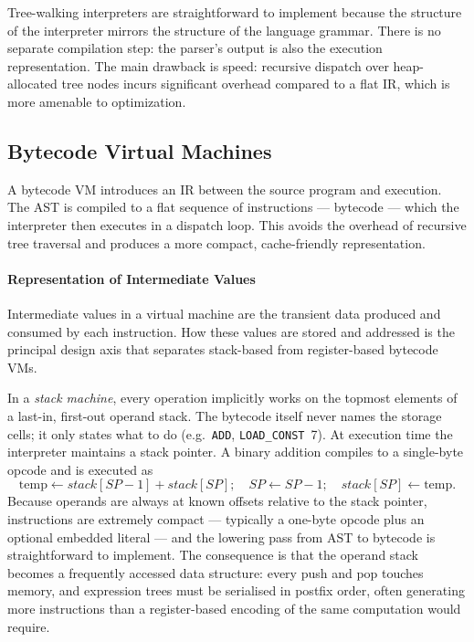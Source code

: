 Tree-walking interpreters are straightforward to implement because the structure of the interpreter mirrors the structure of the language grammar. There is no separate compilation step: the parser's output is also the execution representation. The main drawback is speed: recursive dispatch over heap-allocated tree nodes incurs significant overhead compared to a flat \ac{IR}, which is more amenable to optimization\cite{ball-interpreter-in-go}.

\subsection{Bytecode Virtual Machines}
A bytecode \ac{VM} introduces an \ac{IR} between the source program and execution. The \ac{AST} is compiled to a flat sequence of instructions — bytecode — which the interpreter then executes in a dispatch loop. This avoids the overhead of recursive tree traversal and produces a more compact, cache-friendly representation.

\paragraph{Representation of Intermediate Values}
Intermediate values in a virtual machine are the transient data produced and consumed by each instruction. How these values are stored and addressed is the principal design axis that separates stack-based from register-based bytecode VMs.

In a \emph{stack machine}, every operation implicitly works on the topmost elements of a last-in, first-out operand stack. The bytecode itself never names the storage cells; it only states what to do (e.g.\ \texttt{ADD}, \texttt{LOAD\_CONST}~7). At execution time the interpreter maintains a stack pointer. A binary addition compiles to a single-byte opcode and is executed as
\[
\text{temp} \leftarrow \mathit{stack}[\mathit{SP}-1] + \mathit{stack}[\mathit{SP}]; \quad
\mathit{SP} \leftarrow \mathit{SP}-1; \quad
\mathit{stack}[\mathit{SP}] \leftarrow \text{temp}.
\]
Because operands are always at known offsets relative to the stack pointer, instructions are extremely compact — typically a one-byte opcode plus an optional embedded literal — and the lowering pass from \ac{AST} to bytecode is straightforward to implement. The consequence is that the operand stack becomes a frequently accessed data structure: every push and pop touches memory, and expression trees must be serialised in postfix order, often generating more instructions than a register-based encoding of the same computation would require.

